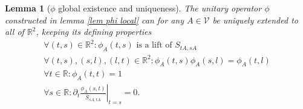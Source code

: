\documentclass[b5paper,draft,openbib,12pt]{memoir}
\newtheorem{Lemma}[Def]{Lemma}
\begin{document}
\begin{Lemma}[\(\phi\) global existence and uniqueness]\label{lem: phi global}
The unitary operator \(\phi\) constructed in lemma \ref{lem phi local} can for any \(A\in\mathcal{V}\) be uniquely extended to all of \(\mathbb{R}^2\), 
keeping its defining properties 
\begin{align}\label{global phi prop1}
\forall (t,s)\in \mathbb{R}^2: \phi_A(t,s) \text{ is a lift of } S_{tA, sA}\\\label{global phi prop2}
\forall (t,s),(s,l),(l,t)\in \mathbb{R}^2: \phi_A(t,s)\phi_A(s,l)=\phi_A(t,l)\\\label{global phi prop3}
\forall t\in\mathbb{R}: \phi_A(t,t)=1\\\label{global phi prop4}
\forall s\in\mathbb{R}: \partial_{t} \left.\frac{\phi_A(s,t)}{\overline{S}_{sA,tA}}\right|_{t=s}=0.
\end{align}
\end{Lemma}
\end{document}
